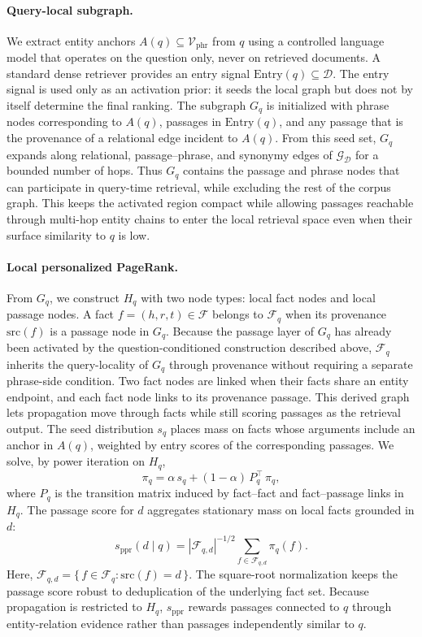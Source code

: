 \paragraph{Query-local subgraph.}
We extract entity anchors $A(q) \subseteq \mathcal{V}_{\mathrm{phr}}$
from $q$ using a controlled language model that operates on the question
only, never on retrieved documents. A standard dense retriever provides
an entry signal $\mathrm{Entry}(q) \subseteq \mathcal{D}$. The entry
signal is used only as an activation prior: it seeds the local graph but
does not by itself determine the final ranking. The subgraph $G_q$ is
initialized with phrase nodes corresponding to $A(q)$, passages in
$\mathrm{Entry}(q)$, and any passage that is the provenance of a
relational edge incident to $A(q)$. From this seed set, $G_q$ expands
along relational, passage--phrase, and synonymy edges of
$\mathcal{G}_{\mathcal{D}}$ for a bounded number of hops. Thus $G_q$
contains the passage and phrase nodes that can participate in query-time
retrieval, while excluding the rest of the corpus graph. This keeps the
activated region compact while allowing passages reachable through
multi-hop entity chains to enter the local retrieval space even when
their surface similarity to $q$ is low.

\paragraph{Local personalized PageRank.}
From $G_q$, we construct $H_q$ with two node types: local fact nodes and
local passage nodes. A fact $f=(h,r,t) \in \mathcal{F}$ belongs to
$\mathcal{F}_q$ when its provenance $\mathrm{src}(f)$ is a passage node
in $G_q$. Because the passage layer of $G_q$ has already been activated
by the question-conditioned construction described above,
$\mathcal{F}_q$ inherits the query-locality of $G_q$ through provenance
without requiring a separate phrase-side condition. Two fact nodes are
linked when their facts share an entity endpoint, and each fact node
links to its provenance passage. This derived graph lets propagation
move through facts while still scoring passages as the retrieval output.
The seed distribution $s_q$ places mass on facts whose arguments include
an anchor in $A(q)$, weighted by entry scores of the corresponding
passages. We solve, by power iteration on $H_q$,
\begin{equation}
\label{eq:local-ppr}
\pi_q = \alpha\, s_q + (1-\alpha)\, P_q^{\!\top}\, \pi_q,
\end{equation}
where $P_q$ is the transition matrix induced by fact--fact and
fact--passage links in $H_q$. The passage score for $d$ aggregates
stationary mass on local facts grounded in $d$:
\begin{equation}
\label{eq:passage-score}
s_{\mathrm{ppr}}(d \mid q)
=
|\mathcal{F}_{q,d}|^{-1/2}
\sum_{f \in \mathcal{F}_{q,d}} \pi_q(f).
\end{equation}
Here,
$\mathcal{F}_{q,d}=\{\,f\in\mathcal{F}_q:\mathrm{src}(f)=d\,\}$.
The square-root normalization keeps the passage score robust to
deduplication of the underlying fact set. Because propagation is
restricted to $H_q$, $s_{\mathrm{ppr}}$ rewards passages connected to
$q$ through entity-relation evidence rather than passages independently
similar to $q$.

